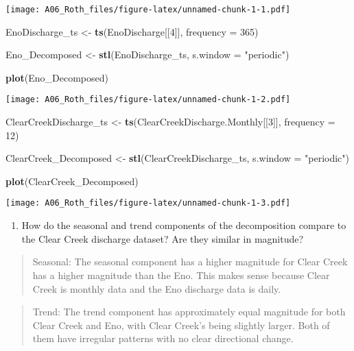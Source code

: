 \documentclass[]{article}
\newenvironment{Shaded}{\begin{snugshade}}{\end{snugshade}}
\newcommand{\DataTypeTok}[1]{\textcolor[rgb]{0.13,0.29,0.53}{#1}}
\newcommand{\DecValTok}[1]{\textcolor[rgb]{0.00,0.00,0.81}{#1}}
\newcommand{\KeywordTok}[1]{\textcolor[rgb]{0.13,0.29,0.53}{\textbf{#1}}}
\newcommand{\NormalTok}[1]{#1}
\newcommand{\StringTok}[1]{\textcolor[rgb]{0.31,0.60,0.02}{#1}}
\providecommand{\tightlist}{%
  \setlength{\itemsep}{0pt}\setlength{\parskip}{0pt}}
\begin{document}
\texttt{[image: A06\_Roth\_files/figure-latex/unnamed-chunk-1-1.pdf]}

\begin{Shaded}
\begin{Highlighting}[]
\NormalTok{EnoDischarge_ts <-}\StringTok{ }\KeywordTok{ts}\NormalTok{(EnoDischarge[[}\DecValTok{4}\NormalTok{]], }\DataTypeTok{frequency =} \DecValTok{365}\NormalTok{)}

\NormalTok{Eno_Decomposed <-}\StringTok{ }\KeywordTok{stl}\NormalTok{(EnoDischarge_ts, }\DataTypeTok{s.window =} \StringTok{"periodic"}\NormalTok{)}

\KeywordTok{plot}\NormalTok{(Eno_Decomposed)}
\end{Highlighting}
\end{Shaded}

\texttt{[image: A06\_Roth\_files/figure-latex/unnamed-chunk-1-2.pdf]}

\begin{Shaded}
\begin{Highlighting}[]
\NormalTok{ClearCreekDischarge_ts <-}\StringTok{ }\KeywordTok{ts}\NormalTok{(ClearCreekDischarge.Monthly[[}\DecValTok{3}\NormalTok{]], }\DataTypeTok{frequency =} \DecValTok{12}\NormalTok{)}

\NormalTok{ClearCreek_Decomposed <-}\StringTok{ }\KeywordTok{stl}\NormalTok{(ClearCreekDischarge_ts, }\DataTypeTok{s.window =} \StringTok{"periodic"}\NormalTok{)}

\KeywordTok{plot}\NormalTok{(ClearCreek_Decomposed)}
\end{Highlighting}
\end{Shaded}

\texttt{[image: A06\_Roth\_files/figure-latex/unnamed-chunk-1-3.pdf]}

\begin{enumerate}
\def\labelenumi{\arabic{enumi}.}
\setcounter{enumi}{9}
\tightlist
\item
  How do the seasonal and trend components of the decomposition compare
  to the Clear Creek discharge dataset? Are they similar in magnitude?
\end{enumerate}

\begin{quote}
Seasonal: The seasonal component has a higher magnitude for Clear Creek
has a higher magnitude than the Eno. This makes sense because Clear
Creek is monthly data and the Eno discharge data is daily.
\end{quote}

\begin{quote}
Trend: The trend component has approximately equal magnitude for both
Clear Creek and Eno, with Clear Creek's being slightly larger. Both of
them have irregular patterns with no clear directional change.
\end{quote}
\end{document}
